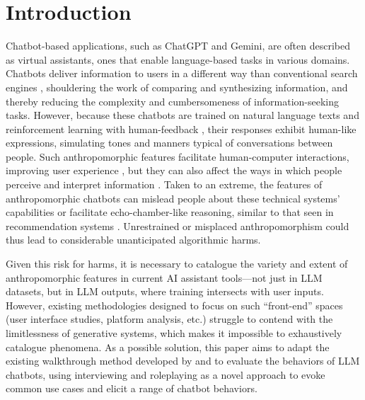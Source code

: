 \section{Introduction}

Chatbot-based applications, such as ChatGPT and Gemini, are often described as virtual assistants, ones that enable language-based tasks in various domains. Chatbots deliver information to users in a different way than conventional search engines \citep{liao2020conversational}, shouldering the work of comparing and synthesizing information, and thereby reducing the complexity and cumbersomeness of information-seeking tasks. However, because these chatbots are trained on natural language texts and reinforcement learning with human-feedback \citep{ouyang2022training, bai2022training, ganguli2022red}, their responses exhibit human-like expressions, simulating tones and manners typical of conversations between people. Such anthropomorphic features facilitate human-computer interactions, improving user experience \citep{kulms2019more, sharma2023human, liao2020conversational}, but they can also affect the ways in which people perceive and interpret information \citep{langer2022look}. Taken to an extreme, the features of anthropomorphic chatbots can mislead people about these technical systems' capabilities \citep{leong2019robot, ruane2019conversational, salles2020anthropomorphism, raji2022fallacy, placani2024anthropomorphism} or facilitate echo-chamber-like reasoning, similar to that seen in recommendation systems \citep{sharma2024generative}. Unrestrained or misplaced anthropomorphism could thus lead to considerable unanticipated algorithmic harms.

Given this risk for harms, it is necessary to catalogue the variety and extent of anthropomorphic features in current AI assistant tools---not just in LLM datasets, but in LLM outputs, where training intersects with user inputs. However, existing methodologies designed to focus on such ``front-end'' spaces (user interface studies, platform analysis, etc.) struggle to contend with the limitlessness of generative systems, which makes it impossible to exhaustively catalogue phenomena. As a possible solution, this paper aims to adapt the existing walkthrough method developed by \citet{light2018walkthrough} and \citet{duguay2023stumbling} to evaluate the behaviors of LLM chatbots, using interviewing and roleplaying \citep{shanahan2023role, shao-etal-2023-character, wang-etal-2024-incharacter, wang-etal-2024-rolellm, tidy2024character} as a novel approach to evoke common use cases and elicit a range of chatbot behaviors.

